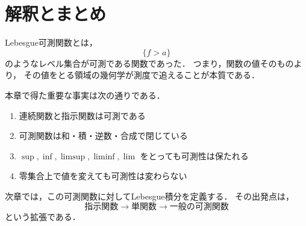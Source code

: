 \section{解釈とまとめ}

Lebesgue可測関数とは，
\[
\{f>a\}
\]
のようなレベル集合が可測である関数であった．
つまり，関数の値そのものより，
その値をとる領域の幾何学が測度で追えることが本質である．

本章で得た重要な事実は次の通りである．
\begin{enumerate}
    \item 連続関数と指示関数は可測である
    \item 可測関数は和・積・逆数・合成で閉じている
    \item $\sup,\inf,\limsup,\liminf,\lim$ をとっても可測性は保たれる
    \item 零集合上で値を変えても可測性は変わらない
\end{enumerate}

次章では，この可測関数に対してLebesgue積分を定義する．
その出発点は，
\[
\text{指示関数} \to \text{単関数} \to \text{一般の可測関数}
\]
という拡張である．
